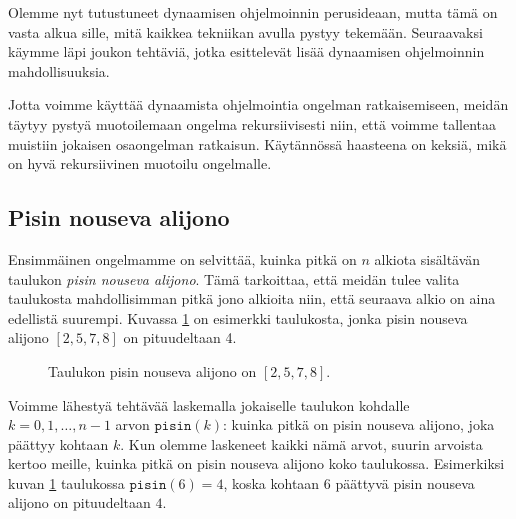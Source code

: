 Olemme nyt tutustuneet dynaamisen ohjelmoinnin perusideaan,
mutta tämä on vasta alkua sille, mitä kaikkea tekniikan
avulla pystyy tekemään.
Seuraavaksi käymme läpi joukon tehtäviä,
jotka esittelevät lisää dynaamisen ohjelmoinnin mahdollisuuksia.

Jotta voimme käyttää dynaamista ohjelmointia ongelman
ratkaisemiseen, meidän täytyy pystyä muotoilemaan ongelma
rekursiivisesti niin, että voimme tallentaa muistiin
jokaisen osaongelman ratkaisun.
Käytännössä haasteena on keksiä, mikä on hyvä rekursiivinen
muotoilu ongelmalle.

\subsection{Pisin nouseva alijono}

Ensimmäinen ongelmamme on selvittää, kuinka pitkä on
$n$ alkiota sisältävän taulukon \emph{pisin nouseva alijono}.
Tämä tarkoittaa, että meidän tulee valita taulukosta
mahdollisimman pitkä jono alkioita niin,
että seuraava alkio on aina edellistä suurempi.
Kuvassa \ref{fig:pisnou} on esimerkki taulukosta,
jonka pisin nouseva alijono $[2,5,7,8]$ on pituudeltaan 4.

\begin{figure}
\center
{}
\caption{Taulukon pisin nouseva alijono on $[2,5,7,8]$.}
\label{fig:pisnou}
\end{figure}

Voimme lähestyä tehtävää laskemalla jokaiselle taulukon
kohdalle $k=0,1,\dots,n-1$ arvon $\texttt{pisin}(k)$:
kuinka pitkä on pisin nouseva alijono, joka päättyy kohtaan $k$.
Kun olemme laskeneet kaikki nämä arvot, suurin arvoista kertoo meille,
kuinka pitkä on pisin nouseva alijono koko taulukossa.
Esimerkiksi kuvan \ref{fig:pisnou} taulukossa $\texttt{pisin}(6)=4$,
koska kohtaan $6$ päättyvä pisin nouseva alijono on pituudeltaan $4$.

